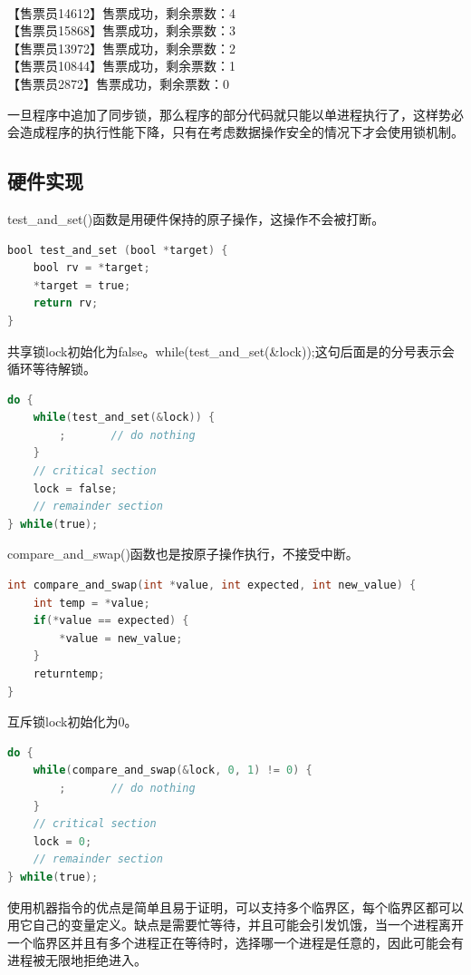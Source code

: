 \begin{tcolorbox}
	 \\
	【售票员14612】售票成功，剩余票数：4 \\
	【售票员15868】售票成功，剩余票数：3 \\
	【售票员13972】售票成功，剩余票数：2 \\
	【售票员10844】售票成功，剩余票数：1 \\
	【售票员2872】售票成功，剩余票数：0
\end{tcolorbox}

一旦程序中追加了同步锁，那么程序的部分代码就只能以单进程执行了，这样势必会造成程序的执行性能下降，只有在考虑数据操作安全的情况下才会使用锁机制。

\subsection{硬件实现}

test\_and\_set()函数是用硬件保持的原子操作，这操作不会被打断。

\begin{lstlisting}[language=C]
bool test_and_set (bool *target) {
	bool rv = *target;
	*target = true;
	return rv;
}
\end{lstlisting}

共享锁lock初始化为false。while(test\_and\_set(\&lock));这句后面是的分号表示会循环等待解锁。

\begin{lstlisting}[language=C]
do {
	while(test_and_set(&lock)) {
		;		// do nothing
	}
	// critical section
	lock = false;
	// remainder section
} while(true);
\end{lstlisting}

compare\_and\_swap()函数也是按原子操作执行，不接受中断。

\begin{lstlisting}[language=C]
int compare_and_swap(int *value, int expected, int new_value) {
	int temp = *value;
	if(*value == expected) {
		*value = new_value;
	}
	returntemp;
}
\end{lstlisting}

互斥锁lock初始化为0。

\begin{lstlisting}[language=C]
do {
	while(compare_and_swap(&lock, 0, 1) != 0) {
		;		// do nothing
	}
	// critical section
	lock = 0;
	// remainder section
} while(true);
\end{lstlisting}

使用机器指令的优点是简单且易于证明，可以支持多个临界区，每个临界区都可以用它自己的变量定义。缺点是需要忙等待，并且可能会引发饥饿，当一个进程离开一个临界区并且有多个进程正在等待时，选择哪一个进程是任意的，因此可能会有进程被无限地拒绝进入。

